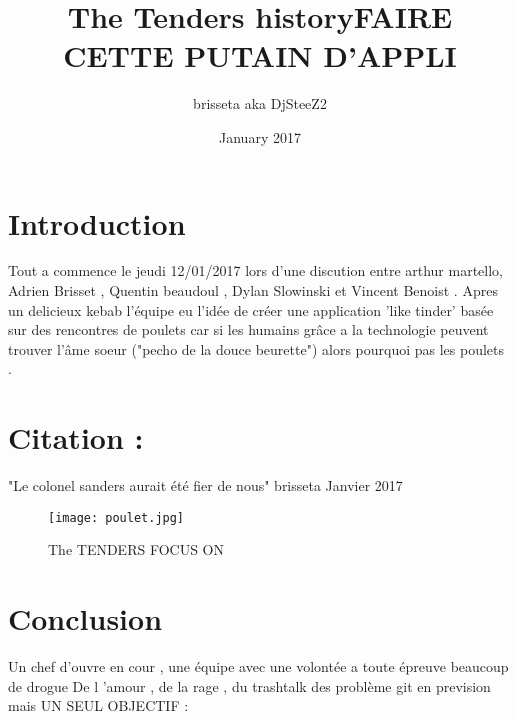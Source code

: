 \documentclass{article}
\title{The Tenders history}
\author{brisseta aka DjSteeZ2 }
\date{January 2017}
\begin{document}
  \maketitle
  \centering
  \section{Introduction}
  Tout a commence le jeudi 12/01/2017 lors d'une discution entre arthur martello, Adrien Brisset , Quentin beaudoul , Dylan Slowinski et Vincent Benoist .
  Apres un delicieux kebab l'équipe eu l'idée de créer une application 'like tinder' basée sur des rencontres de poulets car si les humains grâce a la technologie peuvent trouver l'âme soeur ("pecho de la douce beurette")
  alors pourquoi pas les poulets .
  \centering
  \section{Citation : }
  "Le colonel sanders aurait été fier de nous" brisseta Janvier 2017
  \begin{figure}[h!]
  \centering
  \texttt{[image: poulet.jpg]}
  \caption{The TENDERS FOCUS ON}
  \label{fig:univerise}
  \end{figure}

  \section{Conclusion}
  Un chef d'ouvre en cour , une équipe avec une volontée a toute épreuve beaucoup de drogue
  De l 'amour , de la rage , du trashtalk des problème git en prevision mais UN SEUL OBJECTIF :
  \title{FAIRE CETTE PUTAIN D'APPLI}
  
\end{document}
